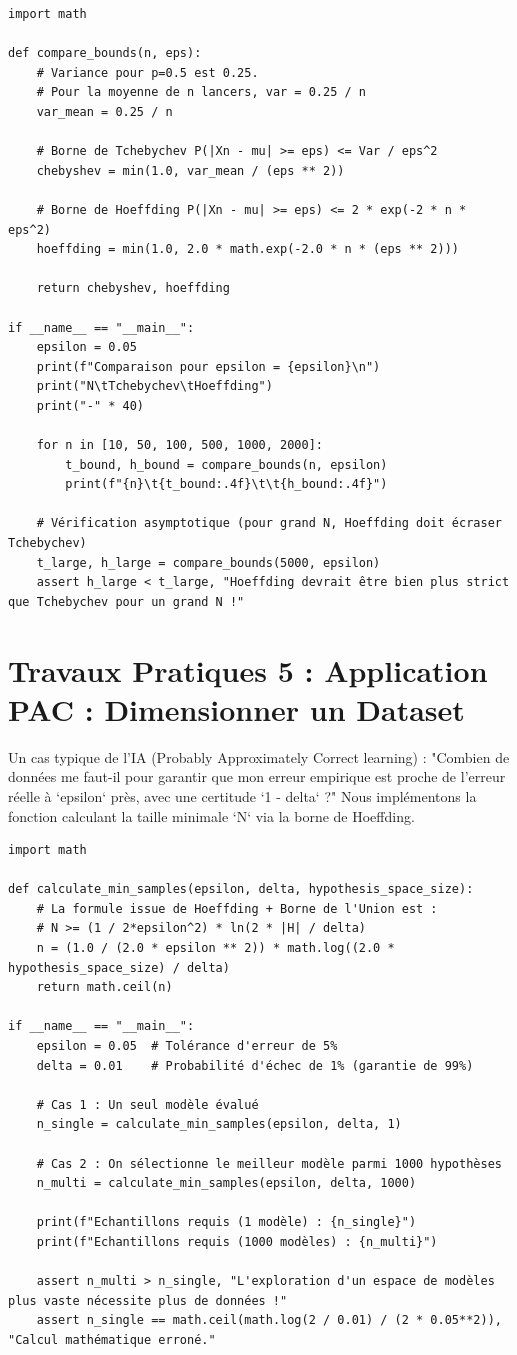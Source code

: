 \documentclass[11pt,a4paper]{article}
\begin{document}
\begin{lstlisting}
import math

def compare_bounds(n, eps):
    # Variance pour p=0.5 est 0.25.
    # Pour la moyenne de n lancers, var = 0.25 / n
    var_mean = 0.25 / n

    # Borne de Tchebychev P(|Xn - mu| >= eps) <= Var / eps^2
    chebyshev = min(1.0, var_mean / (eps ** 2))

    # Borne de Hoeffding P(|Xn - mu| >= eps) <= 2 * exp(-2 * n * eps^2)
    hoeffding = min(1.0, 2.0 * math.exp(-2.0 * n * (eps ** 2)))

    return chebyshev, hoeffding

if __name__ == "__main__":
    epsilon = 0.05
    print(f"Comparaison pour epsilon = {epsilon}\n")
    print("N\tTchebychev\tHoeffding")
    print("-" * 40)

    for n in [10, 50, 100, 500, 1000, 2000]:
        t_bound, h_bound = compare_bounds(n, epsilon)
        print(f"{n}\t{t_bound:.4f}\t\t{h_bound:.4f}")

    # Vérification asymptotique (pour grand N, Hoeffding doit écraser Tchebychev)
    t_large, h_large = compare_bounds(5000, epsilon)
    assert h_large < t_large, "Hoeffding devrait être bien plus strict que Tchebychev pour un grand N !"
\end{lstlisting}


\section*{Travaux Pratiques 5 : Application PAC : Dimensionner un Dataset}

Un cas typique de l'IA (Probably Approximately Correct learning) : "Combien de données me faut-il pour garantir que mon erreur empirique est proche de l'erreur réelle à `epsilon` près, avec une certitude `1 - delta` ?"
Nous implémentons la fonction calculant la taille minimale `N` via la borne de Hoeffding.

\begin{lstlisting}
import math

def calculate_min_samples(epsilon, delta, hypothesis_space_size):
    # La formule issue de Hoeffding + Borne de l'Union est :
    # N >= (1 / 2*epsilon^2) * ln(2 * |H| / delta)
    n = (1.0 / (2.0 * epsilon ** 2)) * math.log((2.0 * hypothesis_space_size) / delta)
    return math.ceil(n)

if __name__ == "__main__":
    epsilon = 0.05  # Tolérance d'erreur de 5%
    delta = 0.01    # Probabilité d'échec de 1% (garantie de 99%)

    # Cas 1 : Un seul modèle évalué
    n_single = calculate_min_samples(epsilon, delta, 1)

    # Cas 2 : On sélectionne le meilleur modèle parmi 1000 hypothèses
    n_multi = calculate_min_samples(epsilon, delta, 1000)

    print(f"Echantillons requis (1 modèle) : {n_single}")
    print(f"Echantillons requis (1000 modèles) : {n_multi}")

    assert n_multi > n_single, "L'exploration d'un espace de modèles plus vaste nécessite plus de données !"
    assert n_single == math.ceil(math.log(2 / 0.01) / (2 * 0.05**2)), "Calcul mathématique erroné."
\end{lstlisting}
\end{document}
